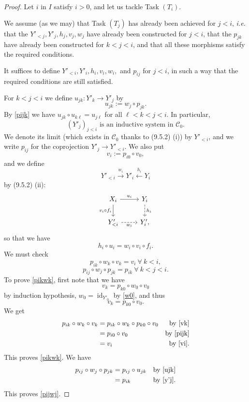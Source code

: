\documentclass[12pt]{article}
\theoremstyle{remark}
\theoremstyle{definition}
\newcommand{\C}{\mathcal C}
\newcommand{\xr}{\xrightarrow}
\DeclareMathOperator{\id}{id}
\begin{document}
\begin{proof}
Let $i$ in $I$ satisfy $i>0$, and let us tackle Task $(T_i)$. 

We assume (as we may) that Task $(T_j)$ has already been achieved for $j<i$, {\em i.e.} that the $Y'_{<j},Y'_j,h_j,v_j,w_j$ have already been constructed for $j<i$, that the $p_{jk}$ have already been constructed for $k<j<i$, and that all these morphisms satisfy the required conditions. 

It suffices to define $Y'_{<i},Y'_i,h_i,v_i,w_i,$ and $p_{ij}$ for $j<i$, in such a way that the required conditions are still satisfied. 

For $k<j<i$ we define $u_{jk}:Y'_k\to Y'_j$ by
%
\begin{equation}\label{ujk}
u_{jk}:=w_j\circ p_{jk}.
\end{equation}
%
By \eqref{pijk} we have $u_{jk}\circ u_{k\ell}=u_{j\ell}$ for all $\ell<k<j<i$. In particular, 
%
\begin{equation}\label{y'j}
(Y'_j)_{j<i}\text{ is an inductive system in }\C_0.
\end{equation}
%
We denote its limit (which exists in $\C_0$ thanks to (9.5.2) (i)) by $Y'_{<i}$, and we write $p_{ij}$ for the coprojection $Y'_j\to Y'_{<i}$. We also put
%
\begin{equation}\label{vi}
v_i:=p_{i0}\circ v_0,
\end{equation}
%
and we define
$$
Y'_{<i}\xr{w_i}Y'_i\xleftarrow{h_i}Y_i
$$
by (9.5.2) (ii):
$$
\begin{tikzcd}
X_i\ar{d}[swap]{v_i\circ f_i}\ar{r}{u_i}&Y_i\ar[dashed]{d}{h_i}\\
Y'_{<i}\ar[dashed]{r}[swap]{w_i}&Y'_i,
\end{tikzcd}
$$
so that we have  
%
\begin{equation}\label{hiui2}
h_i\circ u_i=w_i\circ v_i\circ f_i. 
\end{equation} 
%
We must check 
%
\begin{equation}\label{pikwk}
p_{ik}\circ w_k\circ v_k=v_i\ \forall\ k<i,
\end{equation}
%
\begin{equation}\label{pijwj}
p_{ij}\circ w_j\circ p_{jk}=p_{ik}\ \forall\ k<j<i.
\end{equation} 
%
To prove \eqref{pikwk}, first note that we have 
$$v_k=p_{k0}\circ w_0\circ v_0
$$ 
by induction hypothesis, $w_0=\id_{Y'_0}$ by \eqref{w0}, and thus 
%
\begin{equation}\label{vk}
v_k=p_{k0}\circ v_0.
\end{equation}
%
We get 
% 
\begin{align*}
p_{ik}\circ w_k\circ v_k&=p_{ik}\circ w_k\circ p_{k0}\circ v_0&\text{by \eqref{vk}}\\ 
&=p_{i0}\circ v_0&\text{by \eqref{pijk}}\\ 
&=v_i&\text{by \eqref{vi}}.
\end{align*}
%
This proves \eqref{pikwk}. We have 
% 
\begin{align*}
p_{ij}\circ w_j\circ p_{jk}&=p_{ij}\circ u_{jk}&\text{by \eqref{ujk}}\\ 
&=p_{ik}&\text{by \eqref{y'j}}.
\end{align*}
%
This proves \eqref{pijwj}. 


\end{proof}
\end{document}
